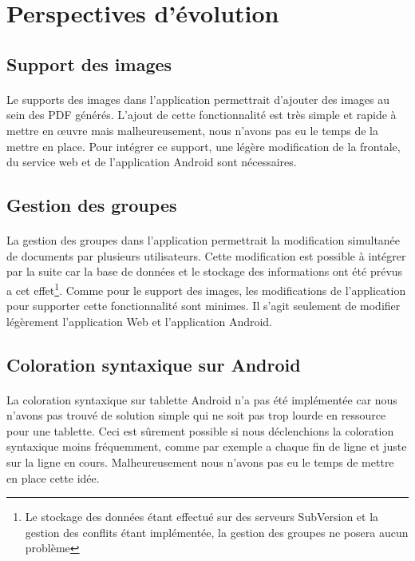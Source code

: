\documentclass[a4paper,12pt]{article}
\begin{document}
\newpage
\section{Perspectives d'évolution}
\subsection{Support des images}
\paragraph*{}
Le supports des images dans l'application permettrait d'ajouter des images au sein des PDF générés. L'ajout de cette fonctionnalité est très simple et rapide à mettre en \oe uvre mais malheureusement, nous n'avons pas eu le temps de la mettre en place. Pour intégrer ce support, une légère modification de la frontale, du service web et de l'application Android sont nécessaires.

\subsection{Gestion des groupes}
\paragraph*{}
La gestion des groupes dans l'application permettrait la modification simultanée de documents par plusieurs utilisateurs. Cette modification est possible à intégrer par la suite car la base de données et le stockage des informations ont été prévus a cet effet\footnote{Le stockage des données étant effectué sur des serveurs SubVersion et la gestion des conflits étant implémentée, la gestion des groupes ne posera aucun problème}. Comme pour le support des images, les modifications de l'application pour supporter cette fonctionnalité sont minimes. Il s'agit seulement de modifier légèrement l'application Web et l'application Android.

\subsection{Coloration syntaxique sur Android}
\paragraph*{}
La coloration syntaxique sur tablette Android n'a pas été implémentée car nous n'avons pas trouvé de solution simple qui ne soit pas trop lourde en ressource pour une tablette. Ceci est sûrement possible si nous déclenchions la coloration syntaxique moins fréquemment, comme par exemple a chaque fin de ligne et juste sur la ligne en cours. Malheureusement nous n'avons pas eu le temps de mettre en place cette idée.
\end{document}
